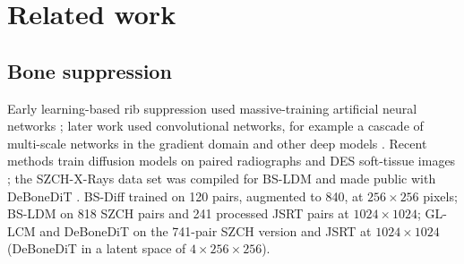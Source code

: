 \section{Related work}
\label{sec:related}
\subsection{Bone suppression}
Early learning-based rib suppression used massive-training artificial neural networks \citep{suzuki2006mtann}; later work used convolutional
networks, for example a cascade of multi-scale networks in the gradient domain \citep{yang2017cascade} and other deep models
\citep{gusarev2017deep}. Recent methods train diffusion models on paired radiographs and DES soft-tissue images
\citep{chen2024bsdiff,sun2026bsldm,sun2025gllcm,sun2026debonedit}; the SZCH-X-Rays data set was compiled for BS-LDM \citep{sun2026bsldm} and made
public with DeBoneDiT \citep{sun2026debonedit}. BS-Diff trained on 120 pairs, augmented to 840, at $256\times256$ pixels; BS-LDM on 818 SZCH
pairs and 241 processed JSRT pairs at $1024\times1024$; GL-LCM and DeBoneDiT on the 741-pair SZCH version and JSRT at $1024\times1024$
(DeBoneDiT in a latent space of $4\times256\times256$).

